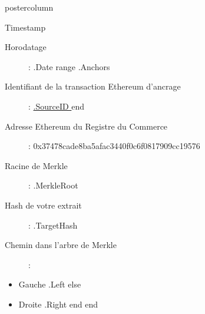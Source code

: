 \documentclass[roundedcorners=true, titleposition=center]{beamerthemeruhuisstijlposter}
\begin{document}
\begin{frame}
\begin{columns}
\begin{column}{0.95\textwidth}
\begin{beamercolorbox}[center, wd=\textwidth]{postercolumn}
\begin{minipage}[T]{0.95\textwidth}
    \hfill
\parbox[t][\columnheight]{\textwidth}{%

\begin{block}{Timestamp}
\begin{description}
\item [Horodatage] :\linebreak
{{ .Date }}
{{ range .Anchors }}
\item [Identifiant de la transaction Ethereum d’ancrage] :\linebreak
\href{https://etherscan.io/tx/{{ .SourceID }} }{ {{.SourceID }} }
{{ end }}
\item[Adresse Ethereum du Registre du Commerce] :\linebreak
0x37478cade8ba5afac3440f0c6f0817909cc19576
\item[Racine de Merkle] :\linebreak
{{ .MerkleRoot }}
\item[Hash de votre extrait] :\linebreak
{{ .TargetHash }}
\item[Chemin dans l’arbre de Merkle] :
\end{description}
\begin{itemize}
{{ range .Proof }}
    {{ if .Left }}
        \item Gauche {{ .Left }}
    {{ else }}
        \item Droite {{ .Right }}
    {{ end }}
{{ end }}
\end{itemize}
\end{block}
}
\end{minipage}
\end{beamercolorbox}
\end{column}
\end{columns}
\end{frame}
\end{document}
